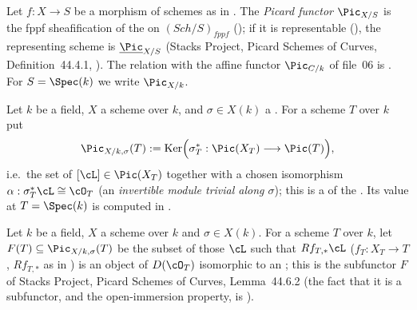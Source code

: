 \begin{definition}\label{def:pc-picard-functor}
Let $f:X\to S$ be a morphism of schemes as in
.  The \emph{Picard functor}
$\Pic_{X/S}$ is the fppf sheafification of the
 on
$(\mathit{Sch}/S)_{fppf}$ (); if it is
representable (), the representing
scheme is $\underline{\Pic}_{X/S}$ (Stacks Project, Picard Schemes of
Curves, Definition~44.4.1,
).  The relation
with the affine functor $\Pic_{C/k}$ of file~06 is
.  For $S=\Spec(k)$ we write
$\Pic_{X/k}$.
\leanok
\end{definition}

\begin{definition}
\label{def:pc-pic-sigma-functor}
Let $k$ be a field, $X$ a scheme over $k$, and $\sigma\in X(k)$ a
.  For a scheme $T$
over $k$ put
\[
\Pic_{X/k,\sigma}(T):=\operatorname{Ker}\Bigl(\sigma_T^*:\Pic(X_T)
\longrightarrow\Pic(T)\Bigr),
\]
i.e.\ the set of $[\cL]\in\Pic(X_T)$ together with a chosen isomorphism
$\alpha:\sigma_T^*\cL\cong\cO_T$ (an \emph{invertible module trivial
along $\sigma$}); this is a
 of the
.  Its value at
$T=\Spec(k)$ is computed in .
\end{definition}

\begin{definition}\label{def:pc-f-subfunctor}
Let $k$ be a field, $X$ a scheme over $k$ and $\sigma\in X(k)$.  For a
scheme $T$ over $k$, let $F(T)\subseteq\Pic_{X/k,\sigma}(T)$ be the
subset of those $\cL$ such that $Rf_{T,*}\cL$ ($f_T:X_T\to T$,
$Rf_{T,*}$ as in ) is an object of
$D(\cO_T)$ isomorphic to an
; this is the subfunctor $F$ of
Stacks Project, Picard Schemes of Curves, Lemma~44.6.2 (the fact that it
is a subfunctor, and the open-immersion property, is
).
\end{definition}

